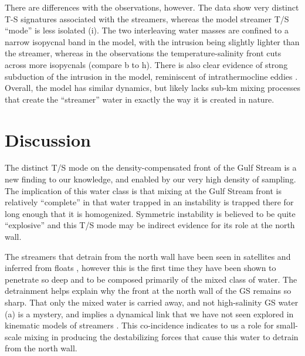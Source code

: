 \documentclass[draft,grl]{agutex2015}
\begin{document}
\begin{article}
There are differences with the observations, however.  The data show very distinct T-S signatures associated with the streamers, whereas the model streamer T/S ``mode'' is less isolated (i).  The two interleaving water masses are confined to a narrow isopycnal band in the model, with the intrusion being slightly lighter than the streamer, whereas in the observations the temperature-salinity front cuts across more isopycnals (compare b to h).   There is also clear evidence of strong subduction of the intrusion in the model, reminiscent of intrathermocline eddies \cite{thomasjoyce10}. Overall, the model has similar dynamics, but likely lacks sub-km mixing processes that create the ``streamer'' water in exactly the way it is created in nature.  

\section{Discussion}

The distinct T/S mode on the density-compensated front of the Gulf Stream is a new finding to our knowledge, and enabled by our very high density of sampling.  The implication of this water class is that mixing at the Gulf Stream front is relatively ``complete'' in that water trapped in an instability is trapped there for long enough that it is homogenized.  Symmetric instability is believed to be quite ``explosive'' and this T/S mode may be indirect evidence for its role at the north wall\citep{dasaroetal11}.    

The streamers that detrain from the north wall have been seen in satellites and inferred from floats \citep{bowerrossby89,flierletal87,lozieretal97,songetal95}, however this is the first time they have been shown to penetrate so deep and to be composed primarily of the mixed class of water.   The detrainment helps explain why the front at the north wall of the GS remains so sharp.  That only the mixed water is carried away, and not high-salinity GS water (a) is a mystery, and implies a dynamical link that we have not seen explored in kinematic models of streamers \citep{bower91,prattetal95,lozieretal97}.  This co-incidence indicates to us a role for small-scale mixing in producing the destabilizing forces that cause this water to detrain from the north wall.  


\end{article}
\end{document}
